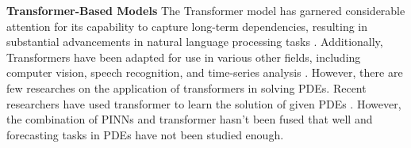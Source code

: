\textbf{Transformer-Based Models}
The Transformer model \cite{vaswani2017attention} has garnered considerable attention for its capability to capture long-term dependencies, resulting in substantial advancements in natural language processing tasks \cite{kalyan2021ammus}. Additionally, Transformers have been adapted for use in various other fields, including computer vision, speech recognition, and time-series analysis \cite{dong2018speech, han2022survey,wen2022transformers}. However, there are few researches on the application of transformers in solving PDEs. Recent researchers have used transformer to learn the solution of given PDEs \cite{cao2021choose, wu2024transolver,zhao2023pinnsformer}. However, the combination of PINNs and transformer hasn't been fused that well and forecasting tasks in PDEs have not been studied enough.